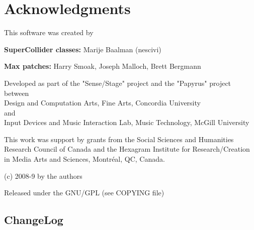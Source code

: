 \documentclass[letterpaper,10pt]{article}
\begin{document}

\section*{Acknowledgments}\label{sec:acknowledgments}
This software was created by

\textbf{SuperCollider classes:}
Marije Baalman (nescivi)  

\textbf{Max patches:}
Harry Smoak, 
Joseph Malloch, 
Brett Bergmann


Developed as part of the "Sense/Stage" project and the "Papyrus" project between\\
Design and Computation Arts, Fine Arts, Concordia University\\
and\\
Input Devices and Music Interaction Lab, Music Technology, McGill University

This work was support by grants from the Social Sciences and Humanities Research Council of Canada and the Hexagram Institute for Research/Creation in Media Arts and Sciences, Montr\'eal, QC, Canada.

(c) 2008-9 by the authors

Released under the GNU/GPL (see COPYING file)

\subsection*{ChangeLog}
\end{document}
